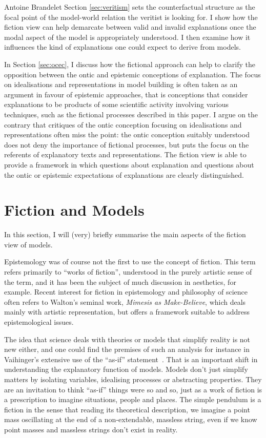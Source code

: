 \begin{artengenv}{Antoine Brandelet}
Section \ref{sec:veritism} sets the counterfactual structure as the focal point of the model-world relation the veritist is looking for. I show how the fiction view can help demarcate between valid and invalid explanations once the modal aspect of the model is appropriately understood. I then examine how it influences the kind of explanations one could expect to derive from models.

In Section \ref{sec:ocec}, I discuss how the fictional approach can help to clarify the opposition between the ontic and epistemic conceptions of explanation. The focus on idealisations and representations in model building is often taken as an argument in favour of epistemic approaches, that is conceptions that consider explanations to be products of some scientific activity involving various techniques, such as the fictional processes described in this paper. I argue on the contrary that critiques of the ontic conception focusing on idealisations and representations often miss the point: the ontic conception suitably understood does not deny the importance of fictional processes, but puts the focus on the referents of explanatory texts and representations. The fiction view is able to provide a framework in which questions about explanation and questions about the ontic or epistemic expectations of explanations are clearly distinguished.


\section{Fiction and Models}\label{sec:fiction}


In this section, I will (very) briefly summarise the main aspects of the fiction view of models.

Epistemology was of course not the first to use the concept of fiction. This term refers primarily to ``works of fiction'', understood in the purely artistic sense of the term, and it has been the subject of much discussion in aesthetics, for example. Recent interest for fiction in epistemology and philosophy of science often refers to Walton's seminal work, \textit{Mimesis as Make-Believe}, which deals mainly with artistic representation, but offers a framework suitable to address epistemological issues.

The idea that science deals with theories or models that simplify reality is not new either, and one could find the premises of such an analysis for instance in Vaihinger's extensive use of the ``as-if'' statement~\parencite{Vaihinger1911eng}. That is an important shift in understanding the explanatory function of models. Models don't just simplify matters by isolating variables, idealising processes or abstracting properties. They are an invitation to think ``as-if'' things were so and so, just as a work of fiction is a prescription to imagine situations, people and places. The simple pendulum is a fiction in the sense that reading its theoretical description, we imagine a point mass oscillating at the end of a non-extendable, massless string, even if we know point masses and massless strings don't exist in reality.


\end{artengenv}
